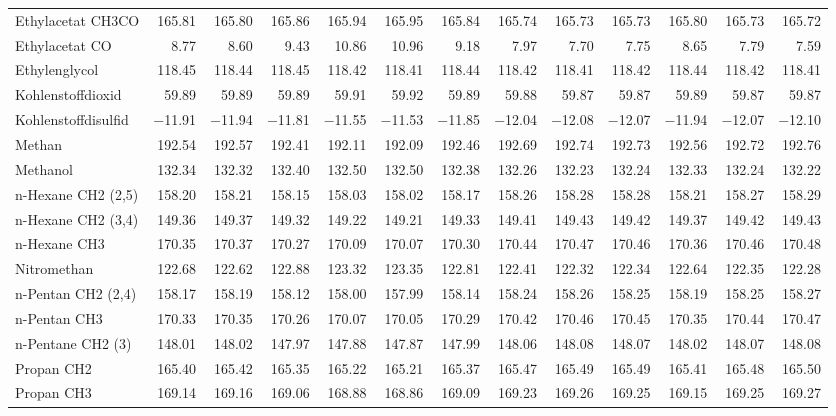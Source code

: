 \begin{table}[ht!]
{\begin{tabular}{lrrrrrrrrrrrr}
    Ethylacetat CH3CO & 165.81 & 165.80 & 165.86 & 165.94 & 165.95 & 165.84 & 165.74 & 165.73 & 165.73 & 165.80 & 165.73 & 165.72 \\
    Ethylacetat CO & 8.77  & 8.60  & 9.43  & 10.86 & 10.96 & 9.18  & 7.97  & 7.70  & 7.75  & 8.65  & 7.79  & 7.59 \\
    Ethylenglycol & 118.45 & 118.44 & 118.45 & 118.42 & 118.41 & 118.44 & 118.42 & 118.41 & 118.42 & 118.44 & 118.42 & 118.41 \\
    Kohlenstoffdioxid & 59.89 & 59.89 & 59.89 & 59.91 & 59.92 & 59.89 & 59.88 & 59.87 & 59.87 & 59.89 & 59.87 & 59.87 \\
    Kohlenstoffdisulfid & $-$11.91 & $-$11.94 & $-$11.81 & $-$11.55 & $-$11.53 & $-$11.85 & $-$12.04 & $-$12.08 & $-$12.07 & $-$11.94 & $-$12.07 & $-$12.10 \\
    Methan & 192.54 & 192.57 & 192.41 & 192.11 & 192.09 & 192.46 & 192.69 & 192.74 & 192.73 & 192.56 & 192.72 & 192.76 \\
    Methanol & 132.34 & 132.32 & 132.40 & 132.50 & 132.50 & 132.38 & 132.26 & 132.23 & 132.24 & 132.33 & 132.24 & 132.22 \\
    n-Hexane CH2 (2,5) & 158.20 & 158.21 & 158.15 & 158.03 & 158.02 & 158.17 & 158.26 & 158.28 & 158.28 & 158.21 & 158.27 & 158.29 \\
    n-Hexane CH2 (3,4) & 149.36 & 149.37 & 149.32 & 149.22 & 149.21 & 149.33 & 149.41 & 149.43 & 149.42 & 149.37 & 149.42 & 149.43 \\
    n-Hexane CH3 & 170.35 & 170.37 & 170.27 & 170.09 & 170.07 & 170.30 & 170.44 & 170.47 & 170.46 & 170.36 & 170.46 & 170.48 \\
    Nitromethan & 122.68 & 122.62 & 122.88 & 123.32 & 123.35 & 122.81 & 122.41 & 122.32 & 122.34 & 122.64 & 122.35 & 122.28 \\
    n-Pentan CH2 (2,4) & 158.17 & 158.19 & 158.12 & 158.00 & 157.99 & 158.14 & 158.24 & 158.26 & 158.25 & 158.19 & 158.25 & 158.27 \\
    n-Pentan CH3 & 170.33 & 170.35 & 170.26 & 170.07 & 170.05 & 170.29 & 170.42 & 170.46 & 170.45 & 170.35 & 170.44 & 170.47 \\
    n-Pentane CH2 (3)  & 148.01 & 148.02 & 147.97 & 147.88 & 147.87 & 147.99 & 148.06 & 148.08 & 148.07 & 148.02 & 148.07 & 148.08 \\
    Propan CH2 & 165.40 & 165.42 & 165.35 & 165.22 & 165.21 & 165.37 & 165.47 & 165.49 & 165.49 & 165.41 & 165.48 & 165.50 \\
    Propan CH3 & 169.14 & 169.16 & 169.06 & 168.88 & 168.86 & 169.09 & 169.23 & 169.26 & 169.25 & 169.15 & 169.25 & 169.27 \\

\end{tabular}}
\end{table}
